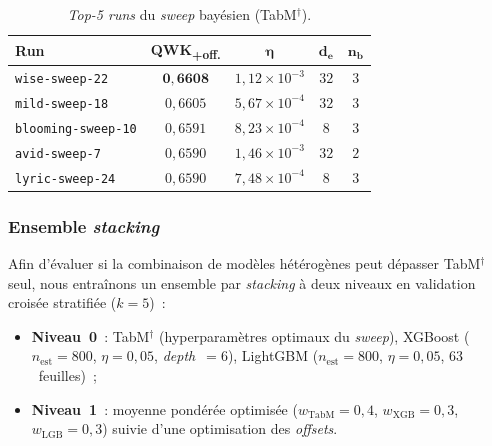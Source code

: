 \documentclass[conference]{IEEEtran}
\begin{document}
\begin{table}[htbp]
\caption{\textit{Top-5 runs} du \textit{sweep} bayésien (TabM$^{\dagger}$).}
\label{tab:sweep}
\centering
\begin{tabular}{lcccc}
\toprule
\textbf{Run} & \textbf{QWK\textsubscript{+off.}} & $\boldsymbol{\eta}$ &
$\boldsymbol{d_e}$ & $\boldsymbol{n_b}$ \\
\midrule
\texttt{wise-sweep-22}     & $\mathbf{0{,}6608}$ & $1{,}12\times 10^{-3}$ & $32$ & $3$ \\
\texttt{mild-sweep-18}     & $0{,}6605$          & $5{,}67\times 10^{-4}$ & $32$ & $3$ \\
\texttt{blooming-sweep-10} & $0{,}6591$          & $8{,}23\times 10^{-4}$ & $8$  & $3$ \\
\texttt{avid-sweep-7}      & $0{,}6590$          & $1{,}46\times 10^{-3}$ & $32$ & $2$ \\
\texttt{lyric-sweep-24}    & $0{,}6590$          & $7{,}48\times 10^{-4}$ & $8$  & $3$ \\
\bottomrule
\end{tabular}
\end{table}

\subsubsection{Ensemble \textit{stacking}}

Afin d'évaluer si la combinaison de modèles hétérogènes peut dépasser TabM$^{\dagger}$ seul, nous entraînons un ensemble par \textit{stacking} à deux niveaux en validation croisée stratifiée ($k=5$)~:
\begin{itemize}
  \item \textbf{Niveau~0}~: TabM$^{\dagger}$ (hyperparamètres optimaux du \textit{sweep}), XGBoost ($n_{\text{est}}=800$, $\eta=0{,}05$, \textit{depth}~$=6$), LightGBM ($n_{\text{est}}=800$, $\eta=0{,}05$, $63$~feuilles)~;
  \item \textbf{Niveau~1}~: moyenne pondérée optimisée ($w_{\text{TabM}}=0{,}4$, $w_{\text{XGB}}=0{,}3$, $w_{\text{LGB}}=0{,}3$) suivie d'une optimisation des \textit{offsets}.
\end{itemize}
\end{document}
